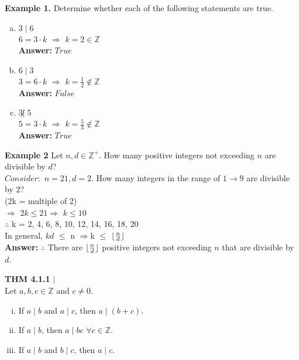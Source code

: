 \documentclass [12pt]{article}
\DeclarePairedDelimiter\floor{\lfloor}{\rfloor}
\begin{document}
\textbf{Example 1.} Determine whether each of the following statements are true.
\vspace{0.25in}
\begin{enumerate}[(a)]
\item $3\;| \;6$ \\
$6 = 3 \cdot k$ \quad $\Rightarrow$ \quad$k = 2 \in \mathbb{Z}$\\
\textbf{Answer:} $True$\\
\vspace{0.5cm}
\item $6\;| \;3$ \\
$3 = 6 \cdot k$ \quad $\Rightarrow$ \quad$k = \frac{1}{2} \notin \mathbb{Z}$\\
\textbf{Answer:} $False$\\
\vspace{0.5cm}
\item $3 \not | \; 5$\\
$5 = 3 \cdot k$ \quad $\Rightarrow$ \quad$k = \frac{5}{3} \notin \mathbb{Z}$\\
\textbf{Answer:} $True$\\
\vspace{1cm}
\end{enumerate}
\raggedright
\textbf{Example 2} Let $n, d \in \mathbb{Z}^{+}$. How many positive integers not exceeding $n$ are divisible by $d$?\\
\quad $Consider:$ $n = 21, d = 2$. How many integers in the range of $1 \to 9$ are divisible by $2$?\\
\quad \quad(2k = multiple of 2)\\
\quad \quad $\Rightarrow$ \quad $2k \leq 21$\quad  $\Rightarrow$ \quad $k \leq 10$\\
\quad \quad $\therefore$ k = 2, 4, 6, 8, 10, 12, 14, 16, 18, 20\vspace{0.15in}\\
\quad  In general, $kd$ $\leq$ n \quad $\Rightarrow$\quad k $\leq$ $\floor{\frac{n}{d}}$\vspace{0.15in}\\
\quad \textbf{Answer: }$\therefore$ There are $\floor{\frac{n}{d}}$ positive integers not exceeding $n$ that are divisible by $d$.
\pagebreak
\begin{framed}
\textbf{THM 4.1.1} $|$ \\
Let $a, b, c \in \mathbb{Z}$ and $c\neq 0$. \\
\begin{enumerate}[(i)]
\item If $a \; | \; b$ and $a\;|\;c$, then $a\;|\;(b + c)$.
\item If $a \; | \; b$, then $a\;|\;bc$ $\forall c \in \mathbb{Z}$.
\item If $a \;|\; b$ and $b\;|\;c$, then $a\;|\;c$.
\end{enumerate}
\end{framed}
\end{document}
